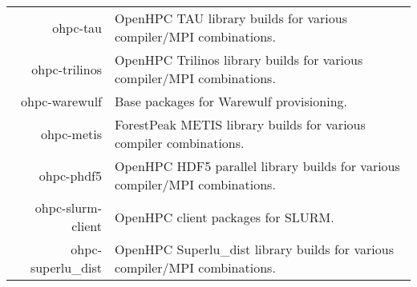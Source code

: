 \begin{tabularx}{\textwidth}{r|X}
ohpc-tau & OpenHPC TAU library builds for various compiler/MPI combinations. \\ 
ohpc-trilinos & OpenHPC Trilinos library builds for various compiler/MPI combinations. \\ 
ohpc-warewulf & Base packages for Warewulf provisioning. \\ 
ohpc-metis & ForestPeak METIS library builds for various compiler combinations. \\ 
ohpc-phdf5 & OpenHPC HDF5 parallel library builds for various compiler/MPI combinations. \\ 
ohpc-slurm-client & OpenHPC client packages for SLURM. \\ 
ohpc-superlu\_dist & OpenHPC Superlu\_dist library builds for various compiler/MPI combinations. \\ 
\bottomrule
\end{tabularx}
